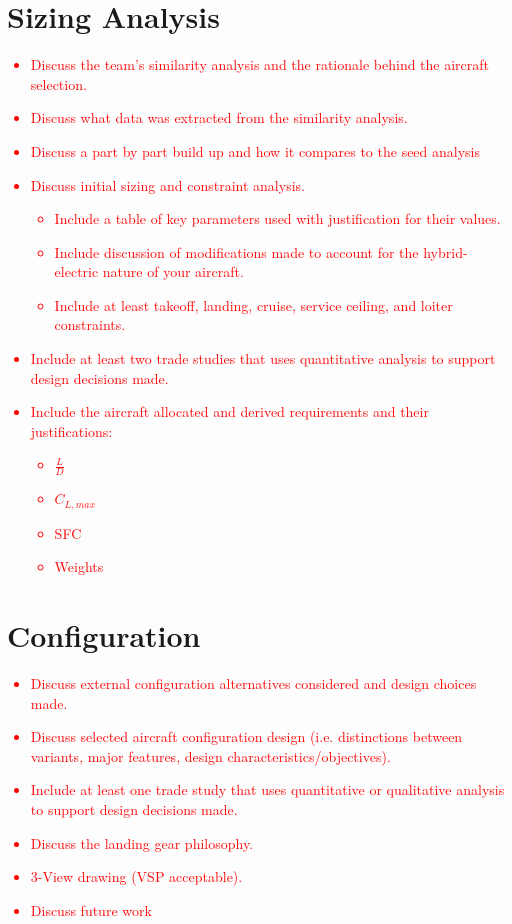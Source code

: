 \documentclass[conf]{new-aiaa}
\begin{document}
\section{Sizing Analysis}
\textcolor{red}{\begin{itemize}
    \item Discuss the team’s similarity analysis and the rationale behind the aircraft selection.
    \item Discuss what data was extracted from the similarity analysis.
    \item Discuss a part by part build up and how it compares to the seed analysis
    \item Discuss initial sizing and constraint analysis.
    \begin{itemize}
        \item Include a table of key parameters used with justification for their values.
        \item Include discussion of modifications made to account for the hybrid-electric nature of your aircraft.
        \item Include at least takeoff, landing, cruise, service ceiling, and loiter constraints.
    \end{itemize}
    \item Include at least two trade studies that uses quantitative analysis to support design decisions made.
    \item Include the aircraft allocated and derived requirements and their justifications:
    \begin{itemize}
        \item $\frac{L}{D}$
        \item $C_{L,max}$
        \item SFC
        \item Weights
    \end{itemize}
\end{itemize}}

\section{Configuration}
\textcolor{red}{
\begin{itemize}
    \item Discuss external configuration alternatives considered and design choices made.
    \item Discuss selected aircraft configuration design (i.e. distinctions between variants, major features, design characteristics/objectives).
    \item Include at least one trade study that uses quantitative or qualitative analysis to support design decisions made.
    \item Discuss the landing gear philosophy.
    \item 3-View drawing (VSP acceptable).
    \item Discuss future work
\end{itemize}}
\end{document}
